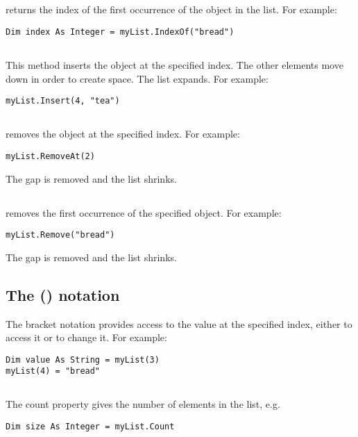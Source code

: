 		\subsection*{}
			 returns the index of the first occurrence of the object in the list. For example:
			\begin{lstlisting}
Dim index As Integer = myList.IndexOf("bread")
			\end{lstlisting}

		\subsection*{}
			This method inserts the object at the specified index. The other elements move down in order to create space. The list expands. For example:
			\begin{lstlisting}
myList.Insert(4, "tea")
			\end{lstlisting}

		\subsection*{}
			 removes the object at the specified index. For example:
			\begin{lstlisting}
myList.RemoveAt(2)
			\end{lstlisting}
			The gap is removed and the list shrinks.

		\subsection*{}
			 removes the first occurrence of the specified object. For example:
			\begin{lstlisting}
myList.Remove("bread")
			\end{lstlisting}
			The gap is removed and the list shrinks.

		\subsection*{The () notation}
			The bracket notation provides access to the value at the specified index, either to access it or to change it. For example:
			\begin{lstlisting}
Dim value As String = myList(3)
myList(4) = "bread"
			\end{lstlisting}

		\subsection*{}
			The count property gives the number of elements in the list, e.g.
			\begin{lstlisting}
Dim size As Integer = myList.Count
			\end{lstlisting}

